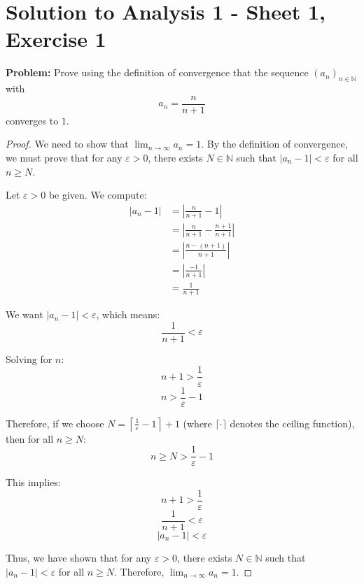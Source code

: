 \documentclass{article}
\begin{document}
\section*{Solution to Analysis 1 - Sheet 1, Exercise 1}

\textbf{Problem:} Prove using the definition of convergence that the sequence $(a_n)_{n \in \mathbb{N}}$ with 
$$a_n = \frac{n}{n+1}$$
converges to $1$.

\begin{proof}
We need to show that $\lim_{n \to \infty} a_n = 1$. By the definition of convergence, we must prove that for any $\varepsilon > 0$, there exists $N \in \mathbb{N}$ such that $|a_n - 1| < \varepsilon$ for all $n \geq N$.

Let $\varepsilon > 0$ be given. We compute:
\begin{align}
|a_n - 1| &= \left|\frac{n}{n+1} - 1\right| \\
&= \left|\frac{n}{n+1} - \frac{n+1}{n+1}\right| \\
&= \left|\frac{n - (n+1)}{n+1}\right| \\
&= \left|\frac{-1}{n+1}\right| \\
&= \frac{1}{n+1}
\end{align}

We want $|a_n - 1| < \varepsilon$, which means:
$$\frac{1}{n+1} < \varepsilon$$

Solving for $n$:
$$n+1 > \frac{1}{\varepsilon}$$
$$n > \frac{1}{\varepsilon} - 1$$

Therefore, if we choose $N = \left\lceil \frac{1}{\varepsilon} - 1 \right\rceil + 1$ (where $\lceil \cdot \rceil$ denotes the ceiling function), then for all $n \geq N$:
$$n \geq N > \frac{1}{\varepsilon} - 1$$

This implies:
$$n + 1 > \frac{1}{\varepsilon}$$
$$\frac{1}{n+1} < \varepsilon$$
$$|a_n - 1| < \varepsilon$$

Thus, we have shown that for any $\varepsilon > 0$, there exists $N \in \mathbb{N}$ such that $|a_n - 1| < \varepsilon$ for all $n \geq N$. Therefore, $\lim_{n \to \infty} a_n = 1$.
\end{proof}
\end{document}
